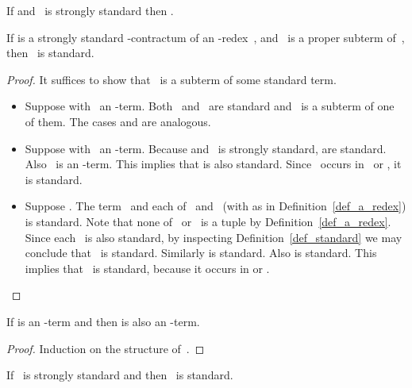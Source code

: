 \documentclass[a4paper,UKenglish]{lipics-v2016}
\begin{document}
\begin{corollary}\label{cor_s_a_commute}
  If  and~ is strongly
  standard then .
\end{corollary}

\begin{lemma}\label{lem_properly_in_a_redex}
  If  is a strongly standard -contractum of an -redex~,
  and~ is a proper subterm of~, then~ is standard.
\end{lemma}

\begin{proof}
  It suffices to show that~ is a subterm of some standard term.
  \begin{itemize}
  \item Suppose  with~ an
    -term. Both~ and~ are standard and~ is a
    subterm of one of them. The cases  and
     are analogous.
  \item Suppose  with~ an
    -term. Because  and~ is strongly standard,
     are standard. Also~ is an -term. This implies that
     is also standard. Since~ occurs in~ or
    , it is standard.
  \item Suppose
    . The
    term~ and each of~ and~ (with  as in
    Definition~\ref{def_a_redex}) is standard. Note that none of~
    or~ is a tuple by Definition~\ref{def_a_redex}. Since
    each~ is also standard, by inspecting
    Definition~\ref{def_standard} we may conclude
    that~ is standard. Similarly
     is standard. Also
     is standard. This
    implies that~ is standard, because it occurs in
     or
    .
  \end{itemize}
\end{proof}

\begin{lemma}\label{lem_a_preserves_s_term}
  If  is an -term and  then  is also an
  -term.
\end{lemma}

\begin{proof}
  Induction on the structure of~.
\end{proof}

\begin{lemma}\label{lem_expand_a_std}
  If~ is strongly standard and  then~ is standard.
\end{lemma}
\end{document}
